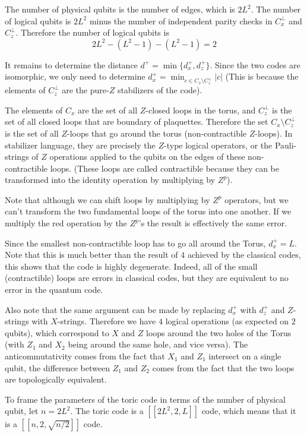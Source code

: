 \documentclass[11pt,a4paper]{article}
\theoremstyle{definition}
\theoremstyle{plain}
\theoremstyle{remark}
\begin{document}
The number of physical qubits is the number of edges, which is $2L^2$. The number of logical qubits is $2L^2$ minus 
the number of independent parity checks in $C_x^\perp$ and $C_z^\perp$. Therefore the number of logical qubits is 
$$2 L^2 - (L^2 - 1) - (L^2 - 1) = 2$$

It remains to determine the distance $d^+ = \min \{d_x^+, d_z^+\}$. Since the two codes are isomorphic, 
we only need to determine $d_x^+ = \min_{c \in C_x \setminus C_z^\perp} |c|$ (This is because the elements of $C_z^\perp$ are the pure-$Z$ stabilizers 
of the code). 

The elements of $C_x$ are the set of all $Z$-closed loops in the torus, and $C_z^\perp$ is the set of all closed loops that are 
boundary of plaquettes. Therefore the set $C_x \setminus C_z^\perp$ is the set of all $Z$-loops that go around the torus (non-contractible $Z$-loops). 
In stabilizer language, they are precisely the $Z$-type logical operators, or the Pauli-strings of $Z$ operations applied to the qubits on the edges of 
these non-contractible loops. (These loops are called contractible because they can be transformed into the identity operation by multiplying by $Z^p$). 

Note that although we can shift loops by multiplying by $Z^p$ operators, but we can't transform the two fundamental loops of the torus into one another. 
If we multiply the red operation by the $Z^p$'s the result is effectively the same error. 

Since the smallest non-contractible loop has to go all around the Torus, $d_x^+ = L$. Note that this is much better than the 
result of $4$ achieved by the classical codes, this shows that the code is highly degenerate. Indeed, all of the small (contractible) 
loops are errors in classical codes, but they are equivalent to no error in the quantum code. 

Also note that the same argument can be made by replacing $d_x^+$ with $d_z^+$ and $Z$-strings with $X$-strings. Therefore 
we have $4$ logical operations (as expected on $2$ qubits), which correspond to $X$ and $Z$ loops around the two holes of the Torus (with $Z_1$ and $X_2$ being around the same hole, 
and vice versa). The anticommutativity comes from the fact that $X_1$ and $Z_1$ intersect on a single qubit, the difference between $Z_1$ and 
$Z_2$ comes from the fact that the two loops are topologically equivalent. 

To frame the parameters of the toric code in terms of the number of physical qubit, let $n = 2L^2$. The toric code is a 
$[[2L^2, 2, L]]$ code, which means that it is a $[[n, 2, \sqrt{n/2}]]$ code. 
\end{document}
